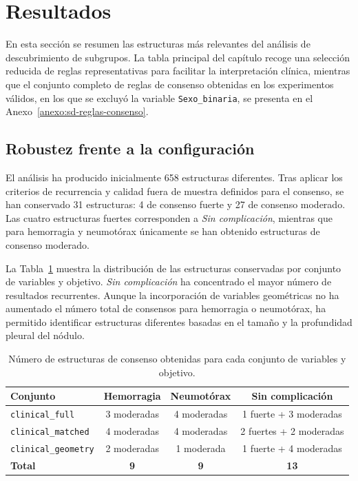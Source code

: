 \section{Resultados}
En esta sección se resumen las estructuras más relevantes del análisis de descubrimiento de subgrupos. La tabla principal del capítulo recoge una selección reducida de reglas representativas para facilitar la interpretación clínica, mientras que el conjunto completo de reglas de consenso obtenidas en los experimentos válidos, en los que se excluyó la variable \texttt{Sexo\_binaria}, se presenta en el Anexo~\ref{anexo:sd-reglas-consenso}.

\subsection{Robustez frente a la configuración}

El análisis ha producido inicialmente 658 estructuras diferentes. Tras aplicar los criterios de recurrencia y calidad fuera de muestra definidos para el consenso, se han conservado 31 estructuras: 4 de consenso fuerte y 27 de consenso moderado. Las cuatro estructuras fuertes corresponden a \textit{Sin complicación}, mientras que para hemorragia y neumotórax únicamente se han obtenido estructuras de consenso moderado.

La Tabla~\ref{tab:sd_numero_consensos} muestra la distribución de las estructuras conservadas por conjunto de variables y objetivo. \textit{Sin complicación} ha concentrado el mayor número de resultados recurrentes. Aunque la incorporación de variables geométricas no ha aumentado el número total de consensos para hemorragia o neumotórax, ha permitido identificar estructuras diferentes basadas en el tamaño y la profundidad pleural del nódulo.

\begin{table}[!htbp]
\centering
\caption{Número de estructuras de consenso obtenidas para cada conjunto de variables y objetivo.}
\label{tab:sd_numero_consensos}
\small
\setlength{\tabcolsep}{3pt}
\begin{tabular}{p{3.0cm}ccc}
\hline
\textbf{Conjunto} &
\textbf{Hemorragia} &
\textbf{Neumotórax} &
\textbf{Sin complicación} \\
\hline
\texttt{clinical\_full} &
3 moderadas &
4 moderadas &
1 fuerte + 3 moderadas \\
\texttt{clinical\_matched} &
4 moderadas &
4 moderadas &
2 fuertes + 2 moderadas \\
\texttt{clinical\_geometry} &
2 moderadas &
1 moderada &
1 fuerte + 4 moderadas \\
\hline
\textbf{Total} &
\textbf{9} &
\textbf{9} &
\textbf{13} \\
\hline
\end{tabular}
\end{table}

